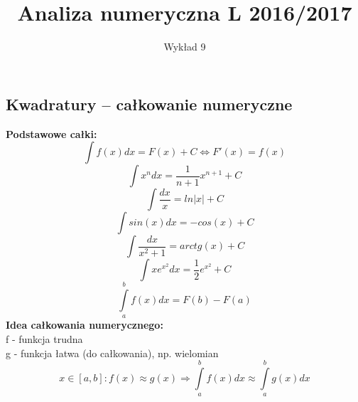 \documentclass[12pt]{article}
\author{\LARGE Wykład 9}
\title{\bfseries\Huge Analiza numeryczna L 2016/2017}
\date{}
\begin{document}
\maketitle
\begin{center}
\section*{\Large Kwadratury -- całkowanie numeryczne}

\end{center}
\vspace{5mm}
\textbf{Podstawowe całki:}\\
$$ \int f(x)dx = F(x) + C \Leftrightarrow F'(x) = f(x)  $$
$$ \int x^ndx = \frac{1}{n+1}x^{n+1} + C $$
$$ \int \frac{dx}{x} = ln|x| +C $$
$$ \int sin(x)dx = -cos(x) + C $$
$$ \int \frac{dx}{x^2 + 1} = arctg(x) +C$$
$$ \int xe^{x^2}dx = \frac{1}{2}e^{x^2} + C $$
$$ \int\limits_{a}^{b}f(x)dx = F(b) - F(a) $$
\textbf{Idea całkowania numerycznego:}\\
f - funkcja trudna\\
g - funkcja łatwa (do całkowania), np. wielomian\\
$$ x \in [a,b]: f(x) \approx g(x) \Rightarrow \int\limits_{a}^{b}f(x)dx \approx \int\limits_{a}^{b}g(x)dx $$
\newpage
\end{document}

